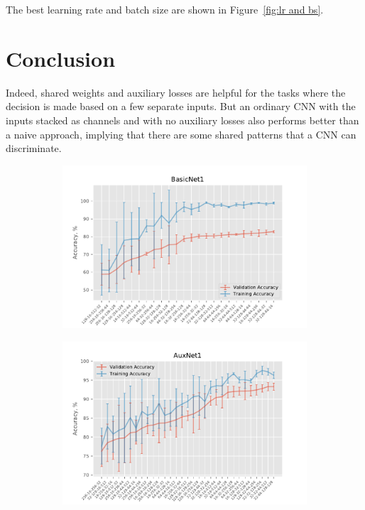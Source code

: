 \documentclass[10pt,conference,compsocconf]{IEEEtran}
\begin{document}
The best learning rate and batch size are shown in Figure~\ref{fig:lr and bs}.

\section{Conclusion}
Indeed, shared weights and auxiliary losses are helpful for the tasks where the decision is made based on a few separate inputs. But an ordinary CNN with the inputs stacked as channels and with no auxiliary losses also performs better than a naive approach, implying that there are some shared patterns that a CNN can discriminate.

\pagebreak

\begin{figure}
    \centering
    \begin{subfigure}[b]{0.475\textwidth}
        \centering
        \includegraphics[width=\textwidth]{BasicNet1.pdf}
        \label{fig:BasicNet1}
    \end{subfigure}
    \hfill
    \begin{subfigure}[b]{0.475\textwidth}  
        \centering 
        \includegraphics[width=\textwidth]{AuxNet1.pdf}

\end{subfigure}
\end{figure}
\end{document}
